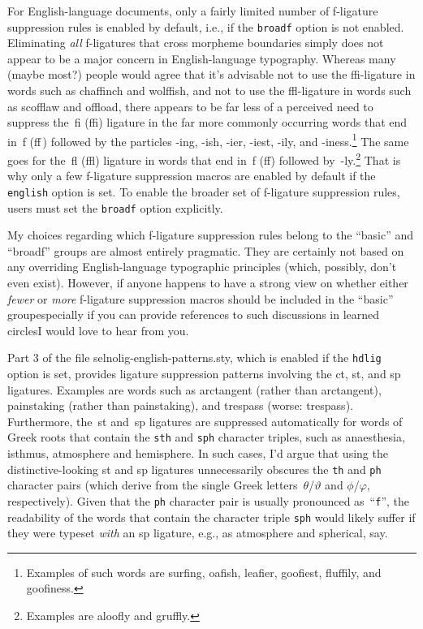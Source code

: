 \documentclass[11pt]{article}
\newcommand{\pkg}[1]{\textsf{#1}}
\newcommand{\opt}[1]{\texttt{#1}}
\begin{document}
For English-language documents, only a fairly limited number of f-ligature suppression rules is enabled by default, i.e., if the \opt{broadf} option is not enabled. Eliminating \emph{all} f-ligatures that cross morpheme boundaries simply does not appear to be a major concern in English-language typography. Whereas many (maybe most?) people would agree that it's advisable not to use the ffi-ligature in words such as chaffinch and wolffish, and not to use the ffl-ligature in words such as scofflaw and offload, there appears to be far less of a perceived need to suppress the~fi (ffi) ligature in the far more commonly occurring words that end in~f (ff\,) followed by the particles -ing, -ish, -ier, -iest, -ily, and -iness.\footnote{Examples of such words are sur\mbox{fi}ng, oa\mbox{fi}sh, lea\mbox{fi}er, goo\mbox{fi}est, flu\mbox{ffi}ly, and goo\mbox{fi}ness.} The same goes for the~fl (ffl) ligature in words that end in~f (ff) followed by~-ly.\footnote{Examples are \mbox{aloofly} and \mbox{gruffly}.} That is why only a few f-ligature suppression macros are enabled by default if the \opt{english} option is set. To enable the broader set of f-ligature suppression rules, users must set the \opt{broadf} option explicitly.

My choices regarding which f-ligature suppression rules belong to the \enquote{basic} and \enquote{broadf} groups are almost entirely pragmatic. They are certainly not based on any overriding English-language typographic principles (which, possibly, don't even exist). However, if anyone happens to have a strong view on whether either \emph{fewer} or \emph{more} f-ligature suppression macros should be included in the \enquote{basic} group\textemdash especially if you can provide references to such discussions in learned circles\textemdash I would love to hear from you.


Part 3 of the file \pkg{selnolig-english-patterns.sty}, which is enabled if the \opt{hdlig} option is set, provides ligature suppression patterns involving the \mbox{ct}, \mbox{st}, and \mbox{sp} ligatures. Examples are words such as arctangent (rather than ar\mbox{ct}angent), painstaking (rather than pain\mbox{st}aking), and trespass (worse: tre\mbox{sp}ass). Furthermore, the~st and~sp ligatures are suppressed automatically for words of Greek roots that contain the \opt{sth} and \opt{sph} character triples, such as anaesthesia, isthmus, atmosphere and hemisphere. In such cases, I'd argue that using the distinctive-looking st and sp ligatures unnecessarily obscures the \opt{th} and \opt{ph} character pairs (which derive from the single Greek letters~$\theta$/$\vartheta$ and $\phi$/$\varphi$, respectively). Given that the \opt{ph} character pair is usually pronounced as~\enquote{\opt{f}}, the readability of the words that contain the character triple \opt{sph} would likely suffer if they were typeset \emph{with} an sp ligature, e.g., as atmo\mbox{sp}here and \mbox{sp}herical, say.
\end{document}
